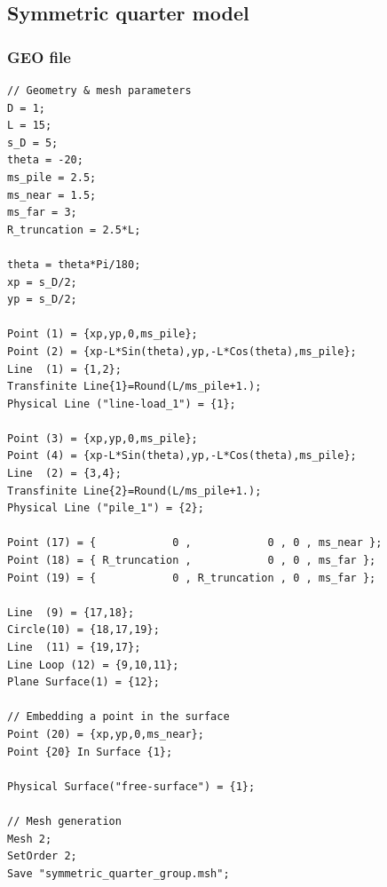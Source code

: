 \documentclass[a4]{article}
\begin{document}
\subsection{Symmetric quarter model}

\subsubsection{GEO file}

\begin{Verbatim}
// Geometry & mesh parameters
D = 1;
L = 15;
s_D = 5; 
theta = -20;  
ms_pile = 2.5;
ms_near = 1.5;
ms_far = 3;
R_truncation = 2.5*L;

theta = theta*Pi/180; 
xp = s_D/2;           
yp = s_D/2;           

Point (1) = {xp,yp,0,ms_pile};                          
Point (2) = {xp-L*Sin(theta),yp,-L*Cos(theta),ms_pile}; 
Line  (1) = {1,2};
Transfinite Line{1}=Round(L/ms_pile+1.);
Physical Line ("line-load_1") = {1};

Point (3) = {xp,yp,0,ms_pile};                           
Point (4) = {xp-L*Sin(theta),yp,-L*Cos(theta),ms_pile};   
Line  (2) = {3,4};
Transfinite Line{2}=Round(L/ms_pile+1.);
Physical Line ("pile_1") = {2};

Point (17) = {            0 ,            0 , 0 , ms_near };
Point (18) = { R_truncation ,            0 , 0 , ms_far };
Point (19) = {            0 , R_truncation , 0 , ms_far };

Line  (9) = {17,18};
Circle(10) = {18,17,19};
Line  (11) = {19,17};
Line Loop (12) = {9,10,11}; 
Plane Surface(1) = {12};

// Embedding a point in the surface 
Point (20) = {xp,yp,0,ms_near};  
Point {20} In Surface {1};

Physical Surface("free-surface") = {1};

// Mesh generation
Mesh 2;
SetOrder 2;
Save "symmetric_quarter_group.msh";
\end{Verbatim}
\end{document}
